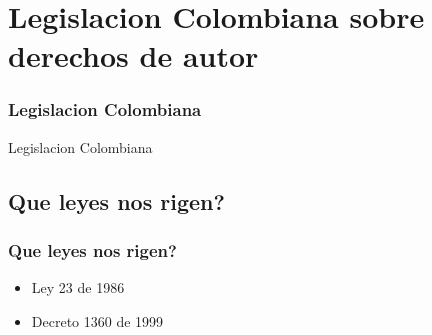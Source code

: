 \section{Legislacion Colombiana sobre derechos de autor}
\frame
{
	\frametitle{Legislacion Colombiana}
	\begin{center}
	Legislacion Colombiana
	\end{center}
}

\subsection{Que leyes nos rigen?}
\frame
{
	\frametitle{Que leyes nos rigen?}
	\begin{itemize}
	\item Ley 23 de 1986
	\item Decreto 1360 de 1999
	\end{itemize}
}